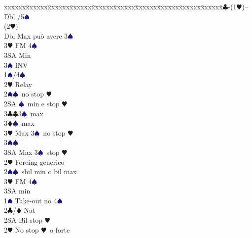 \documentclass[a4paper,italian]{article}
\newcommand{\BC}{\textcolor{OliveGreen}{$\clubsuit$}}
\newcommand{\BD}{\textcolor{RedOrange}{$\vardiamondsuit$}}
\newcommand{\BH}{\textcolor{Red2}{$\varheartsuit${}}}
\newcommand{\BS}{\textcolor{MidnightBlue}{$\spadesuit${}}}
\newenvironment{bidtable}
{\begin{tabbing}

    xxxxxx\=xxxxxx\=xxxxxx\=xxxxxx\=xxxxxx\=xxxxxx\=xxxxxx\=xxxxxx\=xxxxxx\=xxxxxx\=\kill}
{\end{tabbing} }%
\begin{document}
\begin{multicols}{2}
                                        \begin{bidtable}
                                            1\BC-(1\BH)--\+\\
                                            Dbl /5\BS \+\\
                                            (2\BH)\+\\
                                            Dbl \> Max può avere 3\BS \\
                                            3\BH \> FM 4\BS \+\\
                                            3SA \> Min\-\\
                                            3\BS \> INV\-\\
                                            1\BS {}/4\BS \+\\
                                            2\BH \> Relay\+\\
                                            2\BS {}\BS\ no stop \BH \\
                                            2SA \BS\ min e stop \BH \\
                                            3\BC {}\BC 3\BS\ max\\
                                            3\BD {}\BS\ max\\
                                            3\BH \> Max 3\BS\ no stop \BH \\
                                            3\BS {}\BS \\
                                            3SA \> Max 3\BS\ stop \BH \-\-\\
                                            2\BH \> Forcing generico\\
                                            2\BS {}\BS\ sbil min o bil max\\
                                            3\BH \> FM 4\BS \+\\
                                            3SA \> min\-\-\\
                                            1\BS \> Take-out no 4\BS \\
                                            2\BC/\BD \> Nat\+\\
                                            2SA \> Bil stop \BH \\
                                            2\BH \> No stop \BH\ o forte\-\\

\end{bidtable}
\end{multicols}
\end{document}
